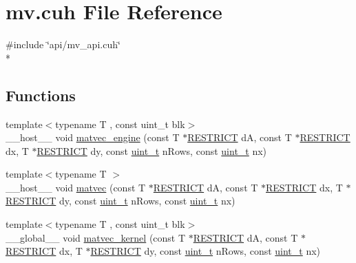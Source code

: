 \hypertarget{mv_8cuh}{}\section{mv.\+cuh File Reference}
\label{mv_8cuh}
{\ttfamily \#include \char`\"{}api/mv\+\_\+api.\+cuh\char`\"{}}\\*
\subsection*{Functions}
\begin{DoxyCompactItemize}
\item 
{\footnotesize template$<$typename T , const uint\+\_\+t blk$>$ }\\\+\_\+\+\_\+host\+\_\+\+\_\+ void \hyperlink{mv_8cuh_a713dc15fab9fbde981c126aaf911c500}{matvec\+\_\+engine} (const T $\ast$\hyperlink{mv__api_8cuh_aae3356b63849abbe8789dd41648ee90a}{R\+E\+S\+T\+R\+I\+C\+T} d\+A, const T $\ast$\hyperlink{mv__api_8cuh_aae3356b63849abbe8789dd41648ee90a}{R\+E\+S\+T\+R\+I\+C\+T} dx, T $\ast$\hyperlink{mv__api_8cuh_aae3356b63849abbe8789dd41648ee90a}{R\+E\+S\+T\+R\+I\+C\+T} dy, const \hyperlink{mv__types_8h_a12a1e9b3ce141648783a82445d02b58d}{uint\+\_\+t} n\+Rows, const \hyperlink{mv__types_8h_a12a1e9b3ce141648783a82445d02b58d}{uint\+\_\+t} nx)
\item 
{\footnotesize template$<$typename T $>$ }\\\+\_\+\+\_\+host\+\_\+\+\_\+ void \hyperlink{mv_8cuh_a988d3fef9af4a5046885005ae4f9ca72}{matvec} (const T $\ast$\hyperlink{mv__api_8cuh_aae3356b63849abbe8789dd41648ee90a}{R\+E\+S\+T\+R\+I\+C\+T} d\+A, const T $\ast$\hyperlink{mv__api_8cuh_aae3356b63849abbe8789dd41648ee90a}{R\+E\+S\+T\+R\+I\+C\+T} dx, T $\ast$\hyperlink{mv__api_8cuh_aae3356b63849abbe8789dd41648ee90a}{R\+E\+S\+T\+R\+I\+C\+T} dy, const \hyperlink{mv__types_8h_a12a1e9b3ce141648783a82445d02b58d}{uint\+\_\+t} n\+Rows, const \hyperlink{mv__types_8h_a12a1e9b3ce141648783a82445d02b58d}{uint\+\_\+t} nx)
\item 
{\footnotesize template$<$typename T , const uint\+\_\+t blk$>$ }\\\+\_\+\+\_\+global\+\_\+\+\_\+ void \hyperlink{mv_8cuh_acd410f399b691b51c28f6f2abc78834e}{matvec\+\_\+kernel} (const T $\ast$\hyperlink{mv__api_8cuh_aae3356b63849abbe8789dd41648ee90a}{R\+E\+S\+T\+R\+I\+C\+T} d\+A, const T $\ast$\hyperlink{mv__api_8cuh_aae3356b63849abbe8789dd41648ee90a}{R\+E\+S\+T\+R\+I\+C\+T} dx, T $\ast$\hyperlink{mv__api_8cuh_aae3356b63849abbe8789dd41648ee90a}{R\+E\+S\+T\+R\+I\+C\+T} dy, const \hyperlink{mv__types_8h_a12a1e9b3ce141648783a82445d02b58d}{uint\+\_\+t} n\+Rows, const \hyperlink{mv__types_8h_a12a1e9b3ce141648783a82445d02b58d}{uint\+\_\+t} nx)
\end{DoxyCompactItemize}


